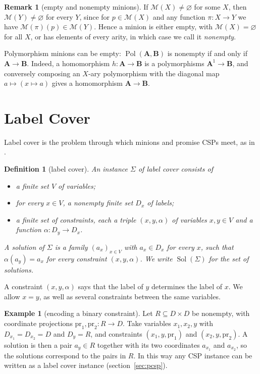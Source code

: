 \documentclass[11pt]{article}
\theoremstyle{plain}
\newtheorem{definition}[theorem]{Definition}
\theoremstyle{definition}
\newtheorem{example}[theorem]{Example}
\newtheorem{remark}[theorem]{Remark}
\newcommand{\Pol}{\operatorname{Pol}}
\newcommand{\Sol}{\operatorname{Sol}}
\newcommand{\pr}{\mathrm{pr}}
\newcommand{\bA}{\mathbf{A}}
\newcommand{\bB}{\mathbf{B}}
\newcommand{\M}{\mathscr{M}}
\begin{document}
\begin{remark}[empty and nonempty minions]\label{rem:nonempty}
If $\M(X)\neq\varnothing$ for some $X$, then $\M(Y)\neq\varnothing$ for every $Y$, since for $p\in\M(X)$ and any function $\pi\colon X\to Y$ we have $\M(\pi)(p)\in\M(Y)$. Hence a minion is either empty, with $\M(X)=\varnothing$ for all $X$, or has elements of every arity, in which case we call it \emph{nonempty}.

Polymorphism minions can be empty: $\Pol(\bA,\bB)$ is nonempty if and only if $\bA\to\bB$. Indeed, a homomorphism $h\colon\bA\to\bB$ is a polymorphisms $\bA^1\to\bB$, and conversely composing an $X$-ary polymorphism with the diagonal map $a\mapsto(x\mapsto a)$ gives a homomorphism $\bA\to\bB$.
\end{remark}

\section{Label Cover}\label{sec:lc}

Label cover is the problem through which minions and promise CSPs meet, as in \cite{BBKO}.

\begin{definition}[label cover]\label{def:lc}
An \emph{instance} $\Sigma$ of label cover consists of
\begin{itemize}
  \item a finite set $V$ of \emph{variables};
  \item for every $x\in V$, a nonempty finite set $D_x$ of \emph{labels};
  \item a finite set of \emph{constraints}, each a triple $(x,y,\alpha)$ of variables $x,y\in V$ and a function $\alpha\colon D_y\to D_x$.
\end{itemize}
A \emph{solution} of $\Sigma$ is a family $(a_x)_{x\in V}$ with $a_x\in D_x$ for every $x$, such that $\alpha(a_y)=a_x$ for every constraint $(x,y,\alpha)$. We write $\Sol(\Sigma)$ for the set of solutions.
\end{definition}

A constraint $(x,y,\alpha)$ says that the label of $y$ determines the label of $x$. We allow $x=y$, as well as several constraints between the same variables.

\begin{example}[encoding a binary constraint]\label{ex:binary}
Let $R\subseteq D\times D$ be nonempty, with coordinate projections $\pr_1,\pr_2\colon R\to D$. Take variables $x_1,x_2,y$ with $D_{x_1}=D_{x_2}=D$ and $D_y=R$, and constraints $(x_1,y,\pr_1)$ and $(x_2,y,\pr_2)$. A solution is then a pair $a_y\in R$ together with its two coordinates $a_{x_1}$ and $a_{x_2}$, so the solutions correspond to the pairs in $R$. In this way any CSP instance can be written as a label cover instance (section~\ref{sec:pcsp}).
\end{example}
\end{document}
